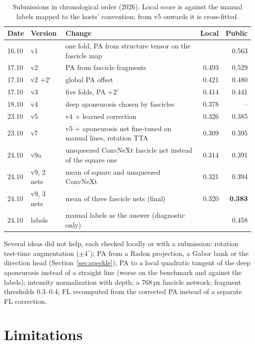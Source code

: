 \documentclass[11pt,a4paper]{article}
\begin{document}
\begin{table}[t]
\centering\small
\caption{Submissions in chronological order (2026). Local score is against the manual labels mapped to the hosts' convention; from v5 onwards it is cross-fitted.}
\label{tab:results}
\begin{tabular}{@{}lllrr@{}}
\toprule
Date & Version & Change & Local & Public \\
\midrule
16.10 & v1 & one fold, PA from structure tensor on the fascicle map & & 0.563 \\
17.10 & v2 & PA from fascicle fragments & 0.493 & 0.529 \\
17.10 & v2 $+2^\circ$ & global PA offset & 0.421 & 0.480 \\
17.10 & v3 & five folds, PA $+2^\circ$ & 0.414 & 0.441 \\
18.10 & v4 & deep aponeurosis chosen by fascicles & 0.378 & -- \\
23.10 & v5 & v4 + learned correction & 0.326 & 0.385 \\
23.10 & v7 & v5 + aponeurosis net fine-tuned on manual lines, rotation TTA & 0.309 & 0.395 \\
24.10 & v9a & unsqueezed ConvNeXt fascicle net instead of the square one & 0.314 & 0.391 \\
24.10 & v9, 2 nets & mean of square and unsqueezed ConvNeXt & 0.321 & 0.394 \\
24.10 & v9, 3 nets & mean of three fascicle nets (final) & 0.320 & \textbf{0.383} \\
24.10 & labels & manual labels as the answer (diagnostic only) & & 0.458 \\
\bottomrule
\end{tabular}
\end{table}

Several ideas did not help, each checked locally or with a submission: rotation test-time augmentation ($\pm4^\circ$); PA from a Radon projection, a Gabor bank or the direction head (Section~\ref{sec:speckle}); PA to a local quadratic tangent of the deep aponeurosis instead of a straight line (worse on the benchmark and against the labels); intensity normalisation with depth; a 768\,px fascicle network; fragment thresholds 0.3--0.4; FL recomputed from the corrected PA instead of a separate FL correction.

\section{Limitations}
\end{document}
